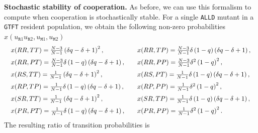 \documentclass[11pt]{article}
\def\alld{\texttt{ALLD}}
\def\gtft{\texttt{GTFT}}
\def\resident{\texttt{R}}
\def\mutant{\texttt{M}}
\theoremstyle{plainCl1}
\theoremstyle{plainCl2}
\begin{document}

\noindent
{\bf Stochastic stability of cooperation.}
As before, we can use this formalism to compute when cooperation is stochastically stable. For a single \alld{} mutant in a \gtft{} resident population, we obtain the following non-zero probabilities \(x(u_{\resident1} u_{\resident 2}, u_{\mutant 1},u_{\mutant 2})\)
\begin{equation*}
  \setlength{\arraycolsep}{10pt}
\begin{array}{ll}
  x(RR, TT) =  \frac{N - 3}{N - 1}\left(\delta q - \delta + 1\right)^{2}, & 
  x(RR, TP) =  \frac{N - 3}{N - 1} \delta \left(1-q \right) \left(\delta q - \delta + 1\right) ,\\[0.2cm]
  x(RR, PT) =  \frac{N - 3}{N - 1} \delta \left(1-q\right) \left(\delta q - \delta + 1\right) , &
  x(RR, PP) =  \frac{N - 3}{N - 1} \delta^{2}  \left(1 - q\right)^{2} , \\[0.2cm]
  x(RS, TT) =  \frac{1}{N-1} \left(\delta q - \delta + 1\right)^{2} , &
  x(RS, PT) =  \frac{1}{N-1} \delta \left(1-q\right) \left(\delta q - \delta + 1\right) , \\[0.2cm]
  x(RP, TP) =  \frac{1}{N-1} \delta \left(1-q\right) \left(\delta q - \delta + 1\right) , &
  x(RP, PP) =  \frac{1}{N-1} \delta^{2} \left(1 - q\right)^{2} , \\[0.2cm]
  x(SR, TT) =  \frac{1}{N-1} \left(\delta q - \delta + 1\right)^{2} , &
  x(SR, TP) =  \frac{1}{N-1} \delta \left(1-q\right) \left(\delta q - \delta + 1\right) , \\[0.2cm]
  x(PR, PT) =  \frac{1}{N-1} \delta \left(1-q\right) \left(\delta q - \delta + 1\right) ,  &
  x(PR, PP) =  \frac{1}{N-1} \delta^{2} \left(1-q\right)^{2} .
  \end{array}
\end{equation*}
The resulting ratio of transition probabilities is
\end{document}
